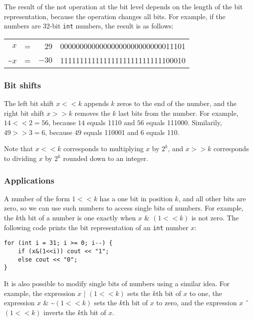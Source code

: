 The result of the not operation at the bit level
depends on the length of the bit representation,
because the operation changes all bits.
For example, if the numbers are 32-bit
\texttt{int} numbers, the result is as follows:

\begin{center}
\begin{tabular}{rrrr}
$x$ & = & 29 &   00000000000000000000000000011101 \\
\textasciitilde$x$ & = & $-30$ & 11111111111111111111111111100010 \\
\end{tabular}
\end{center}

\subsubsection{Bit shifts}


The left bit shift $x < < k$ appends $k$
zeros to the end of the number,
and the right bit shift $x > > k$
removes the $k$ last bits from the number.
For example, $14 < < 2 = 56$,
because $14$ equals 1110
and $56$ equals 111000.
Similarily, $49 > > 3 = 6$,
because $49$ equals 110001
and $6$ equals 110.

Note that $x < < k$
corresponds to multiplying $x$ by $2^k$,
and $x > > k$
corresponds to dividing $x$ by $2^k$
rounded down to an integer.

\subsubsection{Applications}

A number of the form $1 < < k$ has a one bit
in position $k$, and all other bits are zero,
so we can use such numbers to access single bits of numbers.
For example, the $k$th bit of a number is one
exactly when $x$ \& $(1 < < k)$ is not zero.
The following code prints the bit representation
of an \texttt{int} number $x$:

\begin{lstlisting}
for (int i = 31; i >= 0; i--) {
    if (x&(1<<i)) cout << "1";
    else cout << "0";
}
\end{lstlisting}

It is also possible to modify single bits
of numbers using a similar idea.
For example, the expression $x$ | $(1 < < k)$
sets the $k$th bit of $x$ to one,
the expression
$x$ \& \textasciitilde $(1 < < k)$
sets the $k$th bit of $x$ to zero,
and the expression
$x$ $\XOR$ $(1 < < k)$
inverts the $k$th bit of $x$.

